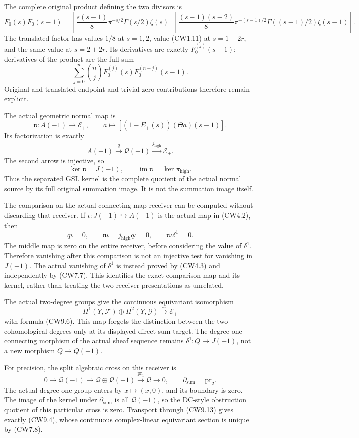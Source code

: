 The complete original product defining the two divisors is \[
F_0(s)F_0(s-1)=
\left[\frac{s(s-1)}8\pi^{-s/2}\Gamma(s/2)\zeta(s)\right]
\left[\frac{(s-1)(s-2)}8\pi^{-(s-1)/2}
\Gamma((s-1)/2)\zeta(s-1)\right].
\tag{CW9.8}
\] The translated factor has values \(1/8\) at \(s=1,2\), value (CW1.11)
at \(s=1-2r\), and the same value at \(s=2+2r\). Its derivatives are
exactly \(F_0^{(j)}(s-1)\); derivatives of the product are the full sum
\[
\sum_{j=0}^{n}\binom njF_0^{(j)}(s)F_0^{(n-j)}(s-1).
\tag{CW9.9}
\] Original and translated endpoint and trivial-zero contributions
therefore remain explicit.

The actual geometric normal map is \[
\mathfrak n:A(-1)\to\mathcal E_+,\qquad
a\mapsto[(1-E_+(s))(\Theta a)(s-1)].
\tag{CW9.10}
\] Its factorization is exactly \[
A(-1)\xrightarrow{q}\mathcal Q(-1)
\xrightarrow{j_{\mathrm{high}}}\mathcal E_+.
\tag{CW9.11}
\] The second arrow is injective, so \[
\ker\mathfrak n=J(-1),\qquad
\operatorname{im}\mathfrak n=\ker\pi_{\mathrm{high}}.
\tag{CW9.12}
\] Thus the separated GSL kernel is the complete quotient of the actual
normal source by its full original summation image. It is not the
summation image itself.

The comparison on the actual connecting-map receiver can be computed
without discarding that receiver. If
\(\iota:J(-1)\hookrightarrow A(-1)\) is the actual map in (CW4.2), then
\[
q\iota=0,\qquad
\mathfrak n\iota=j_{\mathrm{high}}q\iota=0,\qquad
\mathfrak n\iota\delta^1=0.
\tag{CW9.15}
\] The middle map is zero on the entire receiver, before considering the
value of \(\delta^1\). Therefore vanishing after this comparison is not
an injective test for vanishing in \(J(-1)\). The actual vanishing of
\(\delta^1\) is instead proved by (CW4.3) and independently by (CW7.7).
This identifies the exact comparison map and its kernel, rather than
treating the two receiver presentations as unrelated.

The actual two-degree groups give the continuous equivariant isomorphism
\[
H^1(Y,\mathscr F)\oplus H^2(Y,\mathscr G)
\xrightarrow{\sim}\mathcal E_+
\tag{CW9.13}
\] with formula (CW9.6). This map forgets the distinction between the
two cohomological degrees only at its displayed direct-sum target. The
degree-one connecting morphism of the actual sheaf sequence remains
\(\delta^1:Q\to J(-1)\), not a new morphism \(Q\to Q(-1)\).

For precision, the split algebraic cross on this receiver is \[
0\to\mathcal Q(-1)\to\mathcal Q\oplus\mathcal Q(-1)
\xrightarrow{\mathrm{pr}_1}\mathcal Q\to0,\qquad
\partial_{\mathrm{sum}}=\mathrm{pr}_2.
\tag{CW9.14}
\] The actual degree-one group enters by \(x\mapsto(x,0)\), and its
boundary is zero. The image of the kernel under
\(\partial_{\mathrm{sum}}\) is all \(\mathcal Q(-1)\), so the DC-style
obstruction quotient of this particular cross is zero. Transport through
(CW9.13) gives exactly (CW9.4), whose continuous complex-linear
equivariant section is unique by (CW7.8).

